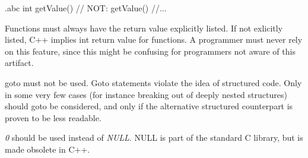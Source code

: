 \begin{filecontents*}{\jobname.abc}
	int getValue()   // NOT: getValue()
	{
		//...
	}
\end{filecontents*}

\recommendation
{Functions must always have the return value explicitly listed.}
{}
{If not exlicitly listed, C++ implies int return value for functions. A programmer must never rely on this feature, since this might be confusing for programmers not aware of this artifact.}

\recommendation
{goto must not be used.}
{}
{Goto statements violate the idea of structured code. Only in some very few cases (for instance breaking out of deeply nested structures) should goto be considered, and only if the alternative structured counterpart is proven to be less readable.}

\recommendation
{\textit{0} should be used instead of \textit{NULL}.}
{}
{NULL is part of the standard C library, but is made obsolete in C++.}
